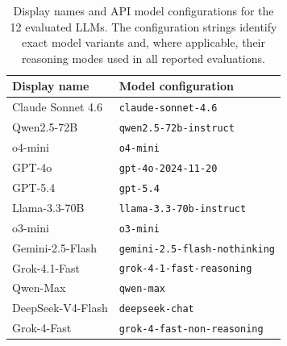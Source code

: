 \begin{table}[t]
\centering
\small
\renewcommand{\arraystretch}{1.30}
\begin{tabular}{ll}
\toprule
\textbf{Display name} & \textbf{Model configuration} \\
\midrule
Claude Sonnet 4.6 & \texttt{claude-sonnet-4.6} \\
Qwen2.5-72B & \texttt{qwen2.5-72b-instruct} \\
o4-mini & \texttt{o4-mini} \\
GPT-4o & \texttt{gpt-4o-2024-11-20} \\
GPT-5.4 & \texttt{gpt-5.4} \\
Llama-3.3-70B & \texttt{llama-3.3-70b-instruct} \\
o3-mini & \texttt{o3-mini} \\
Gemini-2.5-Flash & \texttt{gemini-2.5-flash-nothinking} \\
Grok-4.1-Fast & \texttt{grok-4-1-fast-reasoning} \\
Qwen-Max & \texttt{qwen-max} \\
DeepSeek-V4-Flash & \texttt{deepseek-chat} \\
Grok-4-Fast & \texttt{grok-4-fast-non-reasoning} \\
\bottomrule
\end{tabular}
\caption{Display names and API model configurations for the 12
evaluated LLMs. The configuration strings identify exact model
variants and, where applicable, their reasoning modes used in all
reported evaluations.}
\label{tab:model_configs}
\vspace{-4mm}
\end{table}